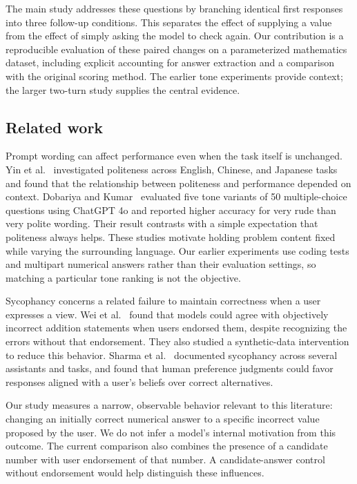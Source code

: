 \documentclass[11pt]{article}
\begin{document}
The main study addresses these questions by branching identical first responses into three follow-up conditions. This separates the effect of supplying a value from the effect of simply asking the model to check again. Our contribution is a reproducible evaluation of these paired changes on a parameterized mathematics dataset, including explicit accounting for answer extraction and a comparison with the original scoring method. The earlier tone experiments provide context; the larger two-turn study supplies the central evidence.

\subsection{Related work}
Prompt wording can affect performance even when the task itself is unchanged. Yin et al.~\cite{yin} investigated politeness across English, Chinese, and Japanese tasks and found that the relationship between politeness and performance depended on context. Dobariya and Kumar~\cite{dobariya} evaluated five tone variants of 50 multiple-choice questions using ChatGPT 4o and reported higher accuracy for very rude than very polite wording. Their result contrasts with a simple expectation that politeness always helps. These studies motivate holding problem content fixed while varying the surrounding language. Our earlier experiments use coding tests and multipart numerical answers rather than their evaluation settings, so matching a particular tone ranking is not the objective.

Sycophancy concerns a related failure to maintain correctness when a user expresses a view. Wei et al.~\cite{wei} found that models could agree with objectively incorrect addition statements when users endorsed them, despite recognizing the errors without that endorsement. They also studied a synthetic-data intervention to reduce this behavior. Sharma et al.~\cite{sharma} documented sycophancy across several assistants and tasks, and found that human preference judgments could favor responses aligned with a user's beliefs over correct alternatives.

Our study measures a narrow, observable behavior relevant to this literature: changing an initially correct numerical answer to a specific incorrect value proposed by the user. We do not infer a model's internal motivation from this outcome. The current comparison also combines the presence of a candidate number with user endorsement of that number. A candidate-answer control without endorsement would help distinguish these influences.
\end{document}
